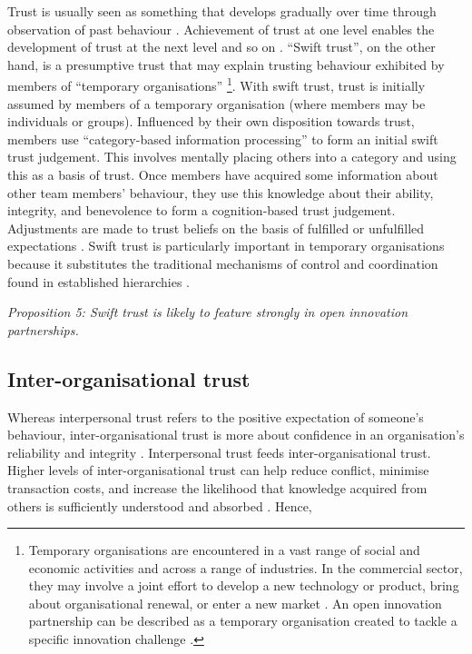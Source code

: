 Trust is usually seen as something that develops gradually over time through observation of past behaviour \citep{mayer1995integrative}. Achievement of trust at one level enables the development of trust at the next level and so on \citep{robert2009individual}. \enquote{Swift trust}, on the other hand, is a presumptive trust that may explain trusting behaviour exhibited by members of \enquote{temporary organisations} \footnote{Temporary organisations are encountered in a vast range of social and economic activities and across a range of industries. In the commercial sector, they may involve a joint effort to develop a new technology or product, bring about organisational renewal, or enter a new market \citep{janowicz2009research}. An open innovation partnership can be described as a temporary organisation created to tackle a specific innovation challenge \citep{cococcioni2014exploring}.}. With swift trust, trust is initially assumed by members of a temporary organisation (where members may be individuals or groups). Influenced by their own disposition towards trust, members use \enquote{category-based information processing} to form an initial swift trust judgement. This involves mentally placing others into a category and using this as a basis of trust. Once members have acquired some information about other team members' behaviour, they use this knowledge about their ability, integrity, and benevolence to form a cognition-based trust judgement. Adjustments are made to trust beliefs on the basis of fulfilled or unfulfilled expectations \citep{meyerson1996swift,robert2009individual}. Swift trust is particularly important in temporary organisations because it substitutes the traditional mechanisms of control and coordination found in established hierarchies \citep{kasper2001communicating}. \medskip

\begin{tcolorbox}
\emph{Proposition 5: Swift trust is likely to feature strongly in open innovation partnerships.}
\end{tcolorbox}

\subsection{Inter-organisational trust}

Whereas interpersonal trust refers to the positive expectation of someone's behaviour, inter-organisational trust is more about confidence in an organisation's reliability and integrity \citep{zaheer1998does,ashnai2016inter}. Interpersonal trust feeds inter-organisational trust. Higher levels of inter-organisational trust can help reduce conflict, minimise transaction costs, and increase the likelihood that knowledge acquired from others is sufficiently understood and absorbed \citep{zaheer1998does,abrams2003nurturing,levin2004strength}. Hence, \medskip

